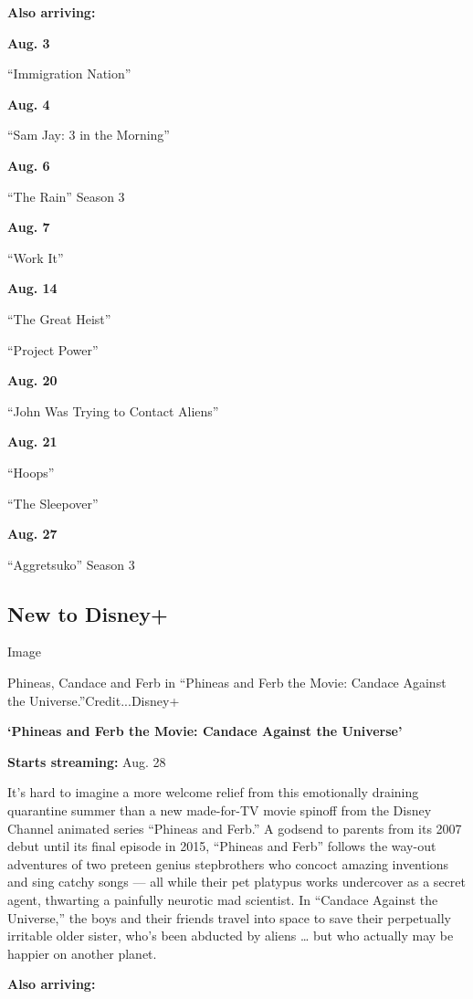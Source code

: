 \textbf{Also arriving:}

\textbf{Aug. 3}

``Immigration Nation''

\textbf{Aug. 4}

``Sam Jay: 3 in the Morning''

\textbf{Aug. 6}

``The Rain'' Season 3

\textbf{Aug. 7}

``Work It''

\textbf{Aug. 14}

``The Great Heist''

``Project Power''

\textbf{Aug. 20}

``John Was Trying to Contact Aliens''

\textbf{Aug. 21}

``Hoops''

``The Sleepover''

\textbf{Aug. 27}

``Aggretsuko'' Season 3

\hypertarget{new-to-disney}{%
\subsection{New to Disney+}\label{new-to-disney}}

Image

Phineas, Candace and Ferb in ``Phineas and Ferb the Movie: Candace
Against the Universe.''Credit...Disney+

\textbf{`Phineas and Ferb the Movie: Candace Against the Universe'}

\textbf{Starts streaming:} Aug. 28

It's hard to imagine a more welcome relief from this emotionally
draining quarantine summer than a new made-for-TV movie spinoff from the
Disney Channel animated series ``Phineas and Ferb.'' A godsend to
parents from its 2007 debut until its final episode in 2015, ``Phineas
and Ferb'' follows the way-out adventures of two preteen genius
stepbrothers who concoct amazing inventions and sing catchy songs ---
all while their pet platypus works undercover as a secret agent,
thwarting a painfully neurotic mad scientist. In ``Candace Against the
Universe,'' the boys and their friends travel into space to save their
perpetually irritable older sister, who's been abducted by aliens
\ldots{} but who actually may be happier on another planet.

\textbf{Also arriving:}

